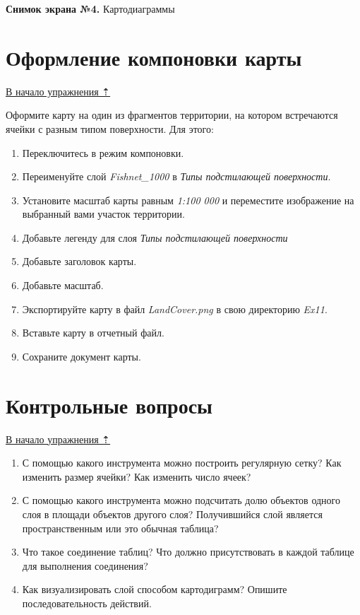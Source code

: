 \documentclass[12pt,]{book}
\begin{document}
\textbf{Снимок экрана №4.} Картодиаграммы

\hypertarget{land-cover-hydro-layout}{%
\section{Оформление компоновки карты}\label{land-cover-hydro-layout}}

\protect\hyperlink{land-cover-hydro}{В начало упражнения ⇡}

Оформите карту на один из фрагментов территории, на котором встречаются ячейки с разным типом поверхности. Для этого:

\begin{enumerate}
\def\labelenumi{\arabic{enumi}.}
\item
  Переключитесь в режим компоновки.
\item
  Переименуйте слой \emph{Fishnet\_1000} в \emph{Типы подстилающей поверхности}.
\item
  Установите масштаб карты равным \emph{1:100 000} и переместите изображение на выбранный вами участок территории.
\item
  Добавьте легенду для слоя \emph{Типы подстилающей поверхности}
\item
  Добавьте заголовок карты.
\item
  Добавьте масштаб.
\item
  Экспортируйте карту в файл \emph{LandCover.png} в свою директорию \emph{Ex11}.
\item
  Вставьте карту в отчетный файл.
\item
  Сохраните документ карты.
\end{enumerate}

\hypertarget{land-cover-hydro-questions}{%
\section{Контрольные вопросы}\label{land-cover-hydro-questions}}

\protect\hyperlink{land-cover-hydro}{В начало упражнения ⇡}

\begin{enumerate}
\def\labelenumi{\arabic{enumi}.}
\item
  С помощью какого инструмента можно построить регулярную сетку? Как изменить размер ячейки? Как изменить число ячеек?
\item
  С помощью какого инструмента можно подсчитать долю объектов одного слоя в площади объектов другого слоя? Получившийся слой является пространственным или это обычная таблица?
\item
  Что такое соединение таблиц? Что должно присутствовать в каждой таблице для выполнения соединения?
\item
  Как визуализировать слой способом картодиграмм? Опишите последовательность действий.
\end{enumerate}
\end{document}
